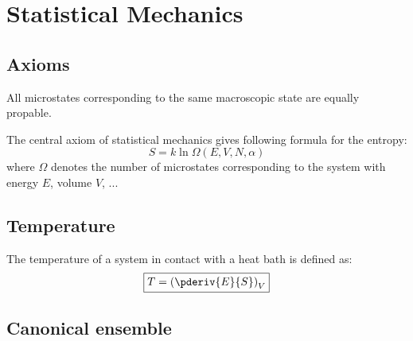 \chapter{Statistical Mechanics}

\section{Axioms}
    
	\begin{theorem}
    		All microstates corresponding to the same macroscopic state are equally propable.
	\end{theorem}
	
	\begin{theorem}
    		The central axiom of statistical mechanics gives following formula for the entropy:
		\begin{equation}
			\label{statmech:boltzmann_formula}
        		\boxed{S = k\ln\Omega(E, V, N, \alpha)}
		\end{equation}
	        where $\Omega$ denotes the number of microstates corresponding to the system with energy $E$, volume $V$, ...
	\end{theorem}
    
\section{Temperature}

    	\begin{formula}
		The temperature of a system in contact with a heat bath is defined as:
		\begin{equation}
		    	\label{statmech:temperature}
			\boxed{T = \left(\pderiv{E}{S}\right)_V}
		\end{equation}
	\end{formula}

\section{Canonical ensemble}

	
